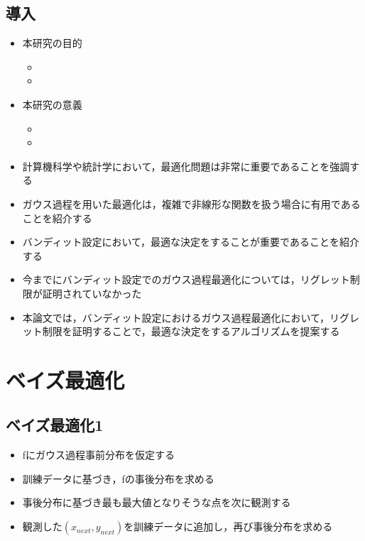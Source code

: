 \documentclass[dvipdfmx, 10.5pt]{beamer}
\begin{document}

\subsection{導入}

\begin{frame}{\insertsubsection}
	\begin{itemize}
		\item 本研究の目的
		\begin{itemize}
			\item 
			\item 
		\end{itemize}
		\item 本研究の意義
		\begin{itemize}
			\item 
			\item 
		\end{itemize}
	\end{itemize}

	\begin{itemize}
		\item 計算機科学や統計学において，最適化問題は非常に重要であることを強調する
		\item ガウス過程を用いた最適化は，複雑で非線形な関数を扱う場合に有用であることを紹介する
		\item バンディット設定において，最適な決定をすることが重要であることを紹介する
		\item 今までにバンディット設定でのガウス過程最適化については，リグレット制限が証明されていなかった
		\item 本論文では，バンディット設定におけるガウス過程最適化において，リグレット制限を証明することで，最適な決定をするアルゴリズムを提案する
	\end{itemize}

\end{frame}

\section{ベイズ最適化}


\subsection{ベイズ最適化1}
\begin{frame}{\insertsubsection}
	\begin{itemize}
		\item fにガウス過程事前分布を仮定する
		\item 訓練データに基づき，fの事後分布を求める
		\item 事後分布に基づき\alert{最も最大値となりそうな点}を次に観測する
		\item 観測した$(x_{next}, y_{next})$を訓練データに追加し，再び事後分布を求める
	\end{itemize}

\end{frame}
\end{document}
